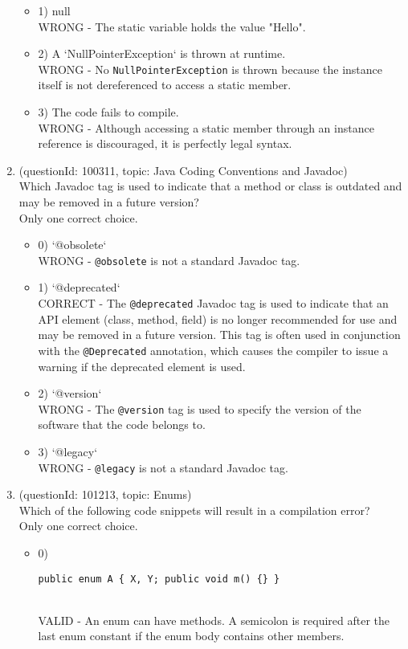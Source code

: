 \documentclass[12pt]{article}
\begin{document}
\begin{enumerate}[label=(\arabic*)]
\begin{itemize}
\item 1) null
 \\ 
WRONG - The static variable holds the value "Hello".

\item 2) A `NullPointerException` is thrown at runtime.
 \\ 
WRONG - No \verb|NullPointerException| is thrown because the instance itself is not dereferenced to access a static member.

\item 3) The code fails to compile.
 \\ 
WRONG - Although accessing a static member through an instance reference is discouraged, it is perfectly legal syntax.

\end{itemize}
\item (questionId: 100311, topic: Java Coding Conventions and Javadoc) \\ 
Which Javadoc tag is used to indicate that a method or class is outdated and may be removed in a future version?
\\ \noindent Only one correct choice. 
\begin{itemize}
\item 0) `@obsolete`
 \\ 
WRONG - \verb|@obsolete| is not a standard Javadoc tag.

\item 1) `@deprecated`
 \\ 
CORRECT - The \verb|@deprecated| Javadoc tag is used to indicate that an API element (class, method, field) is no longer recommended for use and may be removed in a future version. This tag is often used in conjunction with the \verb|@Deprecated| annotation, which causes the compiler to issue a warning if the deprecated element is used.

\item 2) `@version`
 \\ 
WRONG - The \verb|@version| tag is used to specify the version of the software that the code belongs to.

\item 3) `@legacy`
 \\ 
WRONG - \verb|@legacy| is not a standard Javadoc tag.

\end{itemize}
\item (questionId: 101213, topic: Enums) \\ 
Which of the following code snippets will result in a compilation error?
\\ \noindent Only one correct choice. 
\begin{itemize}
\item 0) \begin{verbatim}public enum A { X, Y; public void m() {} }\end{verbatim}
 \\ 
VALID - An enum can have methods. A semicolon is required after the last enum constant if the enum body contains other members.


\end{itemize}
\end{enumerate}
\end{document}
